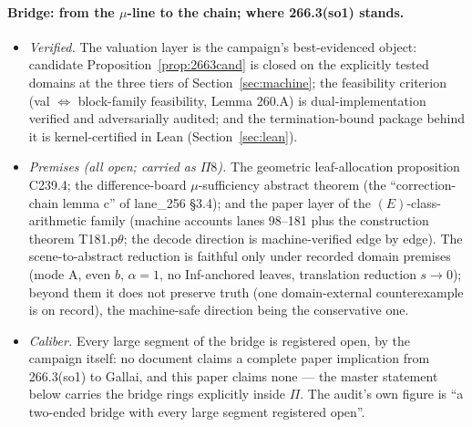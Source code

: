 \paragraph{Bridge: from the $\mu$-line to the chain; where 266.3(so1) stands.}
\begin{itemize}[leftmargin=2em,itemsep=0.1em]
\item \emph{Verified.} The valuation layer is the campaign's best-evidenced object: candidate
Proposition~\ref{prop:2663cand} is closed on the explicitly tested domains at the three tiers
of Section~\ref{sec:machine}; the feasibility criterion (val $\iff$ block-family feasibility,
Lemma 260.A) is dual-implementation verified and adversarially audited; and the
termination-bound package behind it is kernel-certified in Lean (Section~\ref{sec:lean}).
\item \emph{Premises (all open; carried as $\Pi8$).} The geometric leaf-allocation proposition
C239.4; the difference-board $\mu$-sufficiency abstract theorem (the ``correction-chain
lemma c'' of lane\_256 \S3.4); and the paper layer of the $(E)$-class-arithmetic family
(machine accounts lanes 98--181 plus the construction theorem T181.p$\theta$; the decode
direction is machine-verified edge by edge). The scene-to-abstract reduction is faithful only
under recorded domain premises (mode A, even $b$, $\alpha=1$, no Inf-anchored leaves,
translation reduction $s\to0$); beyond
them it does not preserve truth (one domain-external counterexample is on record), the
machine-safe direction being the conservative one.
\item \emph{Caliber.} Every large segment of the bridge is registered open, by the campaign
itself: no document claims a complete paper implication from 266.3(so1) to Gallai, and this
paper claims none --- the master statement below carries the bridge rings explicitly inside
$\Pi$. The audit's own figure is ``a two-ended bridge with every large segment registered
open''.
\end{itemize}

